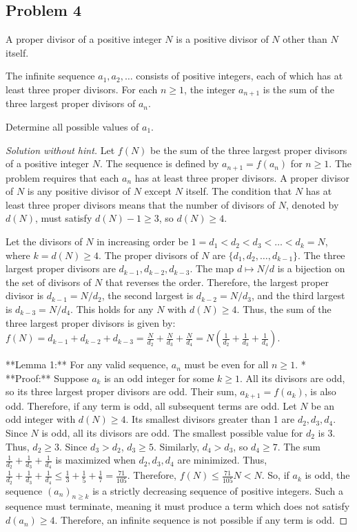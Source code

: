 \subsection{Problem 4}

\begin{problem}
A proper divisor of a positive integer $N$ is a positive divisor of $N$ other than $N$ itself.

The infinite sequence $a_1, a_2, \ldots$ consists of positive integers, each of which has at least three proper divisors. For each $n \ge 1$, the integer $a_{n+1}$ is the sum of the three largest proper divisors of $a_n$.

Determine all possible values of $a_1$.
\end{problem}

\begin{proof} [Solution without hint]
Let $f(N)$ be the sum of the three largest proper divisors of a positive integer $N$. The sequence is defined by $a_{n+1} = f(a_n)$ for $n \ge 1$. The problem requires that each $a_n$ has at least three proper divisors. A proper divisor of $N$ is any positive divisor of $N$ except $N$ itself. The condition that $N$ has at least three proper divisors means that the number of divisors of $N$, denoted by $d(N)$, must satisfy $d(N)-1 \ge 3$, so $d(N) \ge 4$.

Let the divisors of $N$ in increasing order be $1=d_1 < d_2 < d_3 < \dots < d_k=N$, where $k=d(N) \ge 4$. The proper divisors of $N$ are $\{d_1, d_2, \dots, d_{k-1}\}$. The three largest proper divisors are $d_{k-1}, d_{k-2}, d_{k-3}$.
The map $d \mapsto N/d$ is a bijection on the set of divisors of $N$ that reverses the order. Therefore, the largest proper divisor is $d_{k-1} = N/d_2$, the second largest is $d_{k-2} = N/d_3$, and the third largest is $d_{k-3} = N/d_4$. This holds for any $N$ with $d(N) \ge 4$.
Thus, the sum of the three largest proper divisors is given by:
$f(N) = d_{k-1} + d_{k-2} + d_{k-3} = \frac{N}{d_2} + \frac{N}{d_3} + \frac{N}{d_4} = N\left(\frac{1}{d_2}+\frac{1}{d_3}+\frac{1}{d_4}\right)$.

**Lemma 1:** For any valid sequence, $a_n$ must be even for all $n \ge 1$.
*   **Proof:** Suppose $a_k$ is an odd integer for some $k \ge 1$. All its divisors are odd, so its three largest proper divisors are odd. Their sum, $a_{k+1} = f(a_k)$, is also odd. Therefore, if any term is odd, all subsequent terms are odd.
    Let $N$ be an odd integer with $d(N) \ge 4$. Its smallest divisors greater than 1 are $d_2, d_3, d_4$. Since $N$ is odd, all its divisors are odd. The smallest possible value for $d_2$ is 3. Thus, $d_2 \ge 3$. Since $d_3 > d_2$, $d_3 \ge 5$. Similarly, $d_4 > d_3$, so $d_4 \ge 7$.
    The sum $\frac{1}{d_2}+\frac{1}{d_3}+\frac{1}{d_4}$ is maximized when $d_2, d_3, d_4$ are minimized. Thus, $\frac{1}{d_2}+\frac{1}{d_3}+\frac{1}{d_4} \le \frac{1}{3}+\frac{1}{5}+\frac{1}{7} = \frac{71}{105}$.
    Therefore, $f(N) \le \frac{71}{105}N < N$.
    So, if $a_k$ is odd, the sequence $(a_n)_{n \ge k}$ is a strictly decreasing sequence of positive integers. Such a sequence must terminate, meaning it must produce a term which does not satisfy $d(a_n) \ge 4$. Therefore, an infinite sequence is not possible if any term is odd.


\end{proof}
